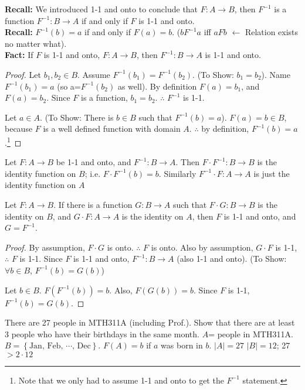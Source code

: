 \noindent
\textbf{Recall:} We introduced 1-1 and onto to conclude that $F: A \to B$, then $F^{-1}$ is a function $F^{-1}:B\to A$ if and only if $F$ is 1-1 and onto.\\
\textbf{Recall:} $F^{-1}(b)=a$ if and only if $F(a)=b$. ($bF^{-1}a$ iff $aFb$ $\leftarrow$ Relation exists no matter what).\\
\textbf{Fact:} If $F$ is 1-1 and onto, $F:A\to B$, then $F^{-1}:B\to A$ is 1-1 and onto.
\begin{proof}
Let $b_1,b_2\in B$. Assume $F^{-1}(b_1)=F^{-1}(b_2)$. (To Show: $b_1=b_2$). Name $F^{-1}(b_1) = a$ (so a=$F^{-1}(b_2)$ as well). By definition $F(a)=b_1$, and $F(a)=b_2$. Since $F$ is a function, $b_1=b_2$. $\therefore$ $F^{-1}$ is 1-1.

Let $a\in A$. (To Show: There is $b\in B$ such that $F^{-1}(b)=a$). $F(a)=b\in B$, because $F$ is a well defined function with domain $A$. $\therefore$ by definition, $F^{-1}(b)=a$.\footnote{Note that we only had to assume 1-1 and onto to get the $F^{-1}$ statement.}
\end{proof}
\begin{theorem}
Let $F:A \to B$ be 1-1 and onto, and $F^{-1}:B\to A$. Then $F\cdot F^{-1}:B\to B$ is the identity function on $B$; i.e. $F\cdot F^{-1}(b)=b$. Similarly $F^{-1}\cdot F:A\to A$ is just the identity function on $A$
\end{theorem}
\begin{theorem}
Let $F:A\to B$. If there is a function $G:B\to A$ such that $F\cdot G: B\to B$ is the identity on $B$, and $G\cdot F:A\to A$ is the identity on $A$, then $F$ is 1-1 and onto, and $G=F^{-1}$.
\end{theorem}
\begin{proof}
By assumption, $F\cdot G$ is onto. $\therefore$ $F$ is onto. Also by assumption, $G\cdot F$ is 1-1, $\therefore$ $F$ is 1-1. Since $F$ is 1-1 and onto, $F^{-1}:B\to A$ (also 1-1 and onto). (To Show: $\forall b\in B$, $F^{-1}(b)=G(b)$)

Let $b\in B$. $F(F^{-1}(b))=b$. Also, $F(G(b))=b$. Since $F$ is 1-1, $F^{-1}(b)=G(b)$.
\end{proof}
\begin{example}
There are 27 people in MTH311A (including Prof.). Show that there are at least 3 people who have their birthdays in the same month. $A$= people in MTH311A. $B = \left\{ \text{Jan, Feb, $\cdots$, Dec} \right\}$. $F(A)=b$ if $a$ was born in $b$. $|A|=27$ $|B|=12$; 27$>2\cdot12$
\end{example}
